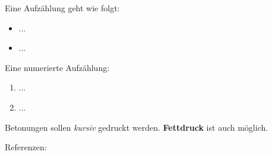 \noindent
Eine Aufz\"ahlung geht wie folgt:
\begin{itemize}
\item ...
\item ...
\end{itemize}
Eine numerierte Aufz\"ahlung:
\begin{enumerate}
\item ...
\item ...
\end{enumerate}

Betonungen sollen \emph{kursiv} gedruckt werden. 
\textbf{Fettdruck} ist auch m\"oglich.

Referenzen: \cite{SaaSchTue97,TueConSaa96ismis,SchTueSaa98preprint}
